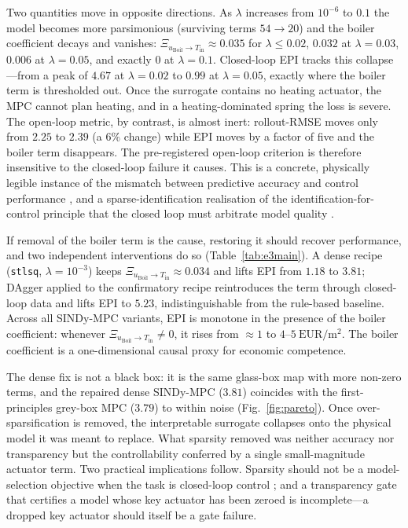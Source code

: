 \documentclass[preprint,3p]{elsarticle}
\begin{document}
Two quantities move in opposite directions. As $\lambda$ increases from $10^{-6}$ to
$0.1$ the model becomes more parsimonious (surviving terms $54\rightarrow20$) and the
boiler coefficient decays and vanishes:
$\Xi_{u_{\mathrm{Boil}}\rightarrow T_{\mathrm{in}}}\approx0.035$ for $\lambda\le0.02$,
$0.032$ at $\lambda=0.03$, $0.006$ at $\lambda=0.05$, and exactly $0$ at $\lambda=0.1$.
Closed-loop EPI tracks this collapse---from a peak of $4.67$ at $\lambda=0.02$ to $0.99$
at $\lambda=0.05$, exactly where the boiler term is thresholded out. Once the surrogate
contains no heating actuator, the MPC cannot plan heating, and in a heating-dominated
spring the loss is severe. The open-loop metric, by contrast, is almost inert:
rollout-RMSE moves only from $2.25$ to $2.39$ (a $6\%$ change) while EPI moves by a
factor of five and the boiler term disappears. The pre-registered open-loop criterion
is therefore insensitive to the closed-loop failure it causes. This is a concrete,
physically legible instance of the mismatch between predictive accuracy and control
performance \citep{lambert2020objective,jacobiandmd2022}, and a sparse-identification
realisation of the identification-for-control principle that the closed loop must
arbitrate model quality \citep{gevers1993,vandenhof1995closedloop}.

If removal of the boiler term is the cause, restoring it should recover performance,
and two independent interventions do so (Table~\ref{tab:e3main}). A dense recipe
(\texttt{stlsq}, $\lambda=10^{-3}$) keeps
$\Xi_{u_{\mathrm{Boil}}\rightarrow T_{\mathrm{in}}}\approx0.034$ and lifts EPI from
$1.18$ to $3.81$; DAgger applied to the confirmatory recipe reintroduces the term
through closed-loop data and lifts EPI to $5.23$, indistinguishable from the rule-based
baseline. Across all SINDy-MPC variants, EPI is monotone in the presence of the boiler
coefficient: whenever $\Xi_{u_{\mathrm{Boil}}\rightarrow T_{\mathrm{in}}}\neq0$, it rises
from $\approx1$ to $4$--$5~\mathrm{EUR/m^2}$. The boiler coefficient is a one-dimensional
causal proxy for economic competence.

The dense fix is not a black box: it is the same glass-box map with more non-zero terms,
and the repaired dense SINDy-MPC ($3.81$) coincides with the first-principles grey-box
MPC ($3.79$) to within noise (Fig.~\ref{fig:pareto}). Once over-sparsification is
removed, the interpretable surrogate collapses onto the physical model it was meant to
replace. What sparsity removed was neither accuracy nor transparency but the
controllability conferred by a single small-magnitude actuator term. Two practical
implications follow. Sparsity should not be a model-selection objective when the task is
closed-loop control \citep{farahmand2017value,cortiella2021sparse,balanceguided2026}; and
a transparency gate that certifies a model whose key actuator has been zeroed is
incomplete---a dropped key actuator should itself be a gate failure.
\end{document}
